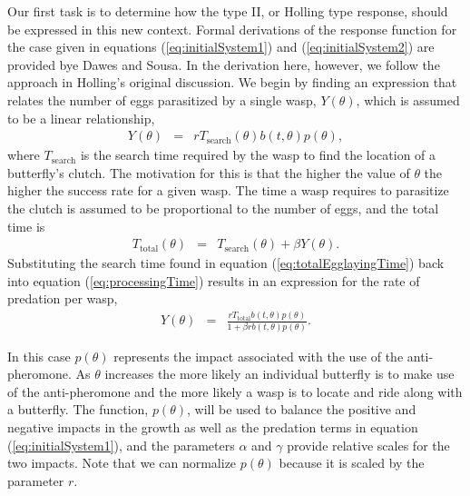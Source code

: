 \documentclass[12pt]{article}
\begin{document}
Our first task is to determine how the type II, or Holling type
response, should be expressed in this new context. Formal derivations
of the response function for the case given in equations
(\ref{eq:initialSystem1}) and (\ref{eq:initialSystem2}) are provided
bye Dawes and Sousa\cite{DAWES201311}.  In the derivation here,
however, we follow the approach in Holling's original
discussion\cite{holling_1959A,holling_1959B}. We begin by finding an
expression that relates the number of eggs parasitized by a single
wasp, $Y(\theta)$, which is assumed to be a linear relationship,
\begin{eqnarray}
  \label{eq:processingTime}
  Y(\theta) & = & r T_{\mathrm{search}}(\theta) b(t,\theta) p(\theta),
\end{eqnarray}
where $T_{\mathrm{search}}$ is the search time required by the wasp to
find the location of a butterfly's clutch. The motivation for this is
that the higher the value of $\theta$ the higher the success rate for
a given wasp.  The time a wasp requires to parasitize the clutch is
assumed to be proportional to the number of eggs, and the total time
is
\begin{eqnarray}
  \label{eq:totalEgglayingTime}
  T_{\mathrm{total}}(\theta) & = & T_{\mathrm{search}}(\theta) + \beta Y(\theta).
\end{eqnarray}
Substituting the search time found in equation
(\ref{eq:totalEgglayingTime}) back into equation
(\ref{eq:processingTime}) results in an expression for the rate of
predation per wasp,
\begin{eqnarray}
  \label{eq:waspPredationRate}
  Y(\theta) & = & \frac{r T_{\mathrm{total}} b(t,\theta) p(\theta)}{1 + \beta r b(t,\theta) p(\theta)}.
\end{eqnarray}

In this case $p(\theta)$ represents the impact associated with the use
of the anti-pheromone. As $\theta$ increases the more likely an
individual butterfly is to make use of the anti-pheromone and the more
likely a wasp is to locate and ride along with a butterfly. The
function, $p(\theta)$, will be used to balance the positive and
negative impacts in the growth as well as the predation terms in
equation (\ref{eq:initialSystem1}), and the parameters $\alpha$ and
$\gamma$ provide relative scales for the two impacts. Note that we can
normalize $p(\theta)$ because it is scaled by the parameter $r$.
\end{document}
